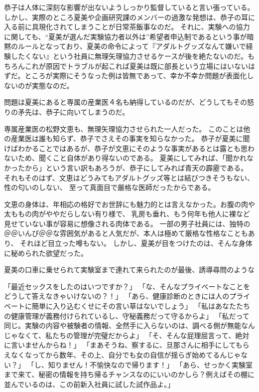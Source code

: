 恭子は人体に深刻な影響が出ないようしっかり監督していると言い張っている。しかし、実際のところ夏美や企画研究課のメンバーの過激な発想は、恭子の耳に入る前に具現化されてしまうことが日常茶飯事なのだ。
それに、実験への協力に関しても、“夏美が選んだ実験協力者以外は”希望者申込制であるという事が暗黙のルールとなっており、夏美の命令によって『アダルトグッズなんて嫌いで経験したくない』という社員に無理矢理協力させるケースが後を絶たないのだ。もちろんこれが原因でトラブルが起これば夏美は既に部長という立場にはいないはずだ。ところが実際にそうなった例は皆無であって、幸か不幸か問題が表面化しないのが実態なのだ。

問題は夏美にあると専属の産業医４名も納得しているのだが、どうしてもその怒りの矛先は、恭子に向いてしまうのだ。

専属産業医の松野文恵も、無理矢理協力させられた一人だった。
このことは他の産業医は誰も知らず、恭子でさえその事実を知らなかった。
恭子が夏美に聞けばわかることではあるが、恭子が文恵にそのような事実があるとは露とも思わないため、聞くこと自体があり得ないのである。
夏美にしてみれば、「聞かれなかったから」という言い訳もあろうが、恭子にしてみれば青天の霹靂である。
それもそのはず、文恵はどうみてもアダルトグッズ等とは結びつきそうもない、性の匂いのしない、
至って真面目で厳格な医師だったからである。

文恵の身体は、年相応の格好でお世辞にも魅力的とは言えなかった。お腹の肉や太ももの肉がややだらしない有り様で、
乳房も垂れ、もう何年も他人に裸など見せていない事が容易に想像される肉体である。
一部の男子社員には、独特の＠＠いんぴ＠＠な雰囲気があると人気だが、本人は極めて厳格な性格なこともあり、
それほど目立った噂もない。
しかし、夏美が目をつけたのは、そんな身体に秘められた欲望だった。

夏美の口車に乗せられて実験室まで連れて来られたのが最後、誘導尋問のような

「最近セックスをしたのはいつですか？」
「な、そんなプライベートなことをどうして答えなきゃいけないの？！」
「あら、健康診断のときには人のプライベートに簡単に入り込むくせにその言い草はないでしょう」
「私はあなたたちの健康管理が義務付けられているし、守秘義務だって守るからよ」
「私だって同じ。実験の内容や被験者の情報、全然手に入らないのは、調べる側が無能なんじゃなくて、私たちの管理が完璧だからよ」
「そ、そんな屁理屈言って、絶対に言いませんからね！」
「まあそうね、察するに、旦那さんに相手にしてもらえなくなってから数年、その上、自分でも女の自信が揺らぎ始めてるんじゃない？」
「し、知りません！不愉快なので帰ります！」
「あら、せっかく実験室まで来て、秘密の情報を持ち帰るチャンスなのにいいのかしら？例えばその棚に並んでいるのは、この前新入社員に試した試作品よ。」

